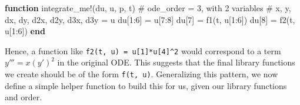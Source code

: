 \documentclass[
]{article}
\newenvironment{Shaded}{\begin{snugshade}}{\end{snugshade}}
\newcommand{\CommentTok}[1]{\textcolor[rgb]{0.37,0.37,0.37}{#1}}
\newcommand{\FloatTok}[1]{\textcolor[rgb]{0.68,0.00,0.00}{#1}}
\newcommand{\FunctionTok}[1]{\textcolor[rgb]{0.28,0.35,0.67}{#1}}
\newcommand{\KeywordTok}[1]{\textcolor[rgb]{0.00,0.23,0.31}{\textbf{#1}}}
\newcommand{\NormalTok}[1]{\textcolor[rgb]{0.00,0.23,0.31}{#1}}
\newcommand{\OperatorTok}[1]{\textcolor[rgb]{0.37,0.37,0.37}{#1}}
\begin{document}
\begin{Shaded}
\begin{Highlighting}[]
\KeywordTok{function} \FunctionTok{integrate\_me!}\NormalTok{(du, u, p, t)}
  \CommentTok{\# ode\_order = 3, with 2 variables}
  \CommentTok{\# x, y, dx, dy, d2x, d2y, d3x, d3y = u}
\NormalTok{  du[}\FloatTok{1}\OperatorTok{:}\FloatTok{6}\NormalTok{] }\OperatorTok{=}\NormalTok{ u[}\FloatTok{7}\OperatorTok{:}\FloatTok{8}\NormalTok{]}
\NormalTok{  du[}\FloatTok{7}\NormalTok{] }\OperatorTok{=} \FunctionTok{f1}\NormalTok{(t, u[}\FloatTok{1}\OperatorTok{:}\FloatTok{6}\NormalTok{])}
\NormalTok{  du[}\FloatTok{8}\NormalTok{] }\OperatorTok{=} \FunctionTok{f2}\NormalTok{(t, u[}\FloatTok{1}\OperatorTok{:}\FloatTok{6}\NormalTok{])}
\KeywordTok{end}
\end{Highlighting}
\end{Shaded}

Hence, a function like \texttt{f2(t,\ u)\ =\ u{[}1{]}*u{[}4{]}\^{}2}
would correspond to a term \(y''' = x (y')^2\) in the original ODE. This
suggests that the final library functions we create should be of the
form \texttt{f(t,\ u)}. Generalizing this pattern, we now define a
simple helper function to build this for us, given our library functions
and order.
\end{document}
